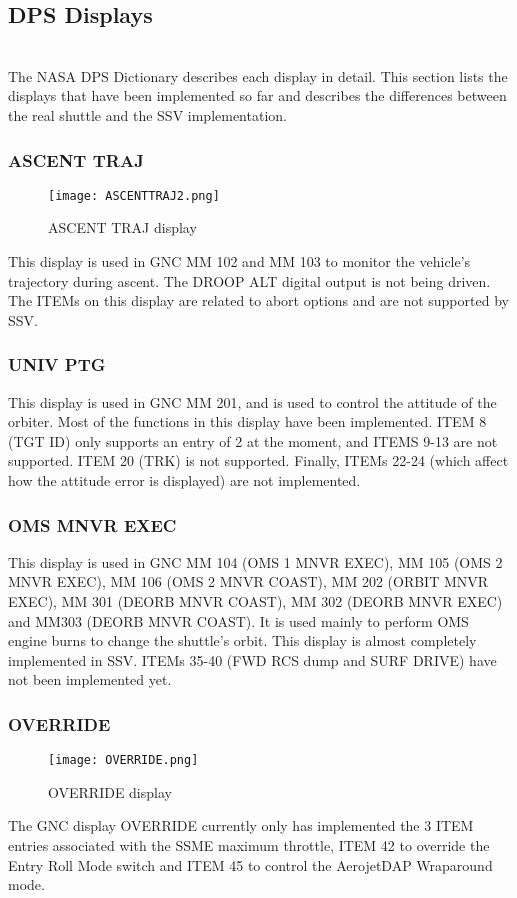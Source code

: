 \documentclass[Space_Shuttle_Vessel_Manual.tex]{subfiles}
\begin{document}
\subsection{DPS Displays}
\begin{multicols*}{2}
\label{sec:dps-displays}
\noindent
\\
The NASA DPS Dictionary describes each display in detail. This section lists the displays that have been implemented so far and describes the differences between the real shuttle and the SSV implementation.


\subsubsection{ASCENT TRAJ}
\begin{figure}[H]
  \texttt{[image: ASCENTTRAJ2.png]}
  \caption{ASCENT TRAJ display}
  \label{fig:ASCENT_TRAJ}
\end{figure}
This display is used in GNC MM 102 and MM 103 to monitor the vehicle's trajectory during ascent. The DROOP ALT digital output is not being driven. The ITEMs on this display are related to abort options and are not supported by SSV.

\subsubsection{UNIV PTG}
This display is used in GNC MM 201, and is used to control the attitude of the orbiter. Most of the functions in this display have been implemented. ITEM 8 (TGT ID) only supports an entry of 2 at the moment, and ITEMS 9-13 are not supported. ITEM 20 (TRK) is not supported. Finally, ITEMs 22-24 (which affect how the attitude error is displayed) are not implemented.

\subsubsection{OMS MNVR EXEC}
This display is used in GNC MM 104 (OMS 1 MNVR EXEC), MM 105 (OMS 2 MNVR EXEC), MM 106 (OMS 2 MNVR COAST), MM 202 (ORBIT MNVR EXEC), MM 301 (DEORB MNVR COAST), MM 302 (DEORB MNVR EXEC) and MM303 (DEORB MNVR COAST). It is used mainly to perform OMS engine burns to change the shuttle's orbit.
This display is almost completely implemented in SSV. ITEMs 35-40 (FWD RCS dump and SURF DRIVE) have not been implemented yet.

\subsubsection{OVERRIDE}
\begin{figure}[H]
  \texttt{[image: OVERRIDE.png]}
  \caption{OVERRIDE display}
  \label{fig:OVERRIDE}
\end{figure}
The GNC display OVERRIDE currently only has implemented the 3 ITEM entries associated with the SSME maximum throttle, ITEM 42 to override the Entry Roll Mode switch and ITEM 45 to control the AerojetDAP Wraparound mode.


\end{multicols*}
\end{document}
